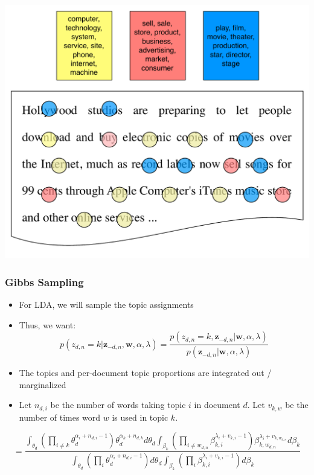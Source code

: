 {\begin{center}
 {\includegraphics[width=.8\linewidth]{topic_models/inference_3}}
	\end{center}
}




\begin{frame}
\frametitle{Gibbs Sampling}
\begin{itemize}
\item For LDA, we will sample the topic assignments
\item Thus, we want:
\begin{equation*}
p(z_{d,n} = k | {\bm z}_{-d,n}, {\bm w}, \alpha, \lambda) = \frac{ p(z_{d,n} = k, {\bm z}_{-d,n} | {\bm w}, \alpha, \lambda)} { p({\bm z}_{-d,n} | {\bm w},\alpha, \lambda)}
\end{equation*}
\pause
\item The topics and per-document topic proportions are integrated out / marginalized
\item Let $n_{d,i}$ be the number of words taking topic $i$ in document $d$.  Let $v_{k,w}$ be the number of times word $w$ is used in topic $k$.
\end{itemize}


\begin{equation*}
= \frac{ \int_{\theta_d} \left( \prod_{i \not = k} \theta_d^{\alpha_i + n_{d,i} - 1} \right)\theta_d^{\alpha_k + n_{d,k} } d\theta_d \int_{\beta_{k}}    \left( \prod_{i \not = w_{d,n}} \beta_{k,i} ^{ \lambda_i + v_{k,i} - 1} \right) \beta_{k, w_{d,n}}^{\lambda_i + v_{k,w_{d,n}}} d\beta_k } { \int_{\theta_d} \left( \prod_{i} \theta_d^{\alpha_i + n_{d,i} - 1} \right) d\theta_d \int_{\beta_{k}}    \left( \prod_{i} \beta_{k,i} ^{ \lambda_i + v_{k,i} - 1} \right) d\beta_k }
\end{equation*}
\end{frame}





